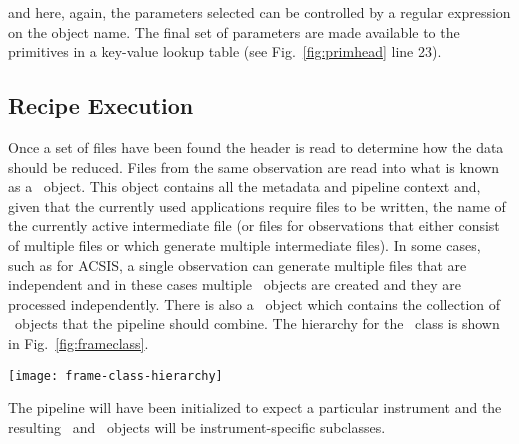 \documentclass[final,authoryear,5p,times,twocolumn]{elsarticle}
\begin{document}
and here, again, the parameters selected can be controlled by a
regular expression on the object name. The final set of parameters are
made available to the primitives in a key-value lookup table (see
Fig.~\ref{fig:primhead} line 23).


\subsection{Recipe Execution}
\label{sec:exec}

Once a set of files have been found the header is read to determine
how the data should be reduced. Files from the same observation are
read into what is known as a \Frame\ object. This object contains all
the metadata and pipeline context and, given that the currently used
applications require files to be written, the name of the
currently active intermediate file (or files for observations that
either consist of multiple files or which generate multiple
intermediate files). In some cases, such as for ACSIS, a single
observation can generate multiple files that are independent and in
these cases multiple \Frame\ objects are created and they are
processed independently. There is also a \Group\ object which
contains the collection of \Frame\ objects that the pipeline should
combine. The hierarchy for the \Frame\ class is shown in
Fig.~\ref{fig:frameclass}.

\begin{figure*}
\texttt{[image: frame-class-hierarchy]}
\caption{Hierarchy for the \Frame\ class. The location of the ESO
  classes reflects an historical anomaly associated with the early
  development of the ESO instrument testing. LCO and Gemini
  instruments also inherit from UKIRT, indicating that the UKIRT
  functionality is not as UKIRT-centric as the name would suggest. The
  second row contains file format specific routines. Most \Frame\
  classes inherit from NDF and this is because most of the FITS-based
  implementations do on the fly format conversion to NDF before the
  \Frame\ object is instantiated.}
\label{fig:frameclass}
\end{figure*}

The pipeline will have been initialized to expect a particular instrument and
the resulting \Frame\ and \Group\ objects will be instrument-specific subclasses.
\end{document}
